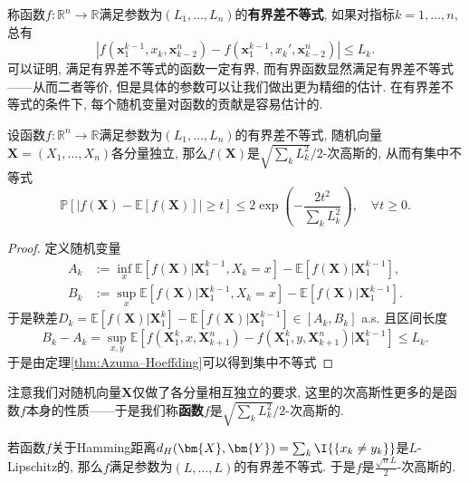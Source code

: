 称函数$f \colon \mathbb{R}^n \to \mathbb{R}$满足参数为$(L_1, \dots, L_n)$的\textbf{有界差不等式}, 如果对指标$k = 1, \dots, n$, 总有
\begin{equation*}
	|f(\bm{x}_1^{k-1}, x_k, \bm{x}_{k-2}^n) - f(\bm{x}_1^{k-1}, x_k', \bm{x}_{k-2}^n)| 
	\leq L_k. 
\end{equation*} 
可以证明, 满足有界差不等式的函数一定有界, 而有界函数显然满足有界差不等式——从而二者等价, 但是具体的参数可以让我们做出更为精细的估计.  
在有界差不等式的条件下, 每个随机变量对函数的贡献是容易估计的.
\begin{corollary}[有界差不等式]\label{cor:BddDiffIneq}
	设函数$f \colon \mathbb{R}^n \to \mathbb{R}$满足参数为$(L_1, \dots, L_n)$的有界差不等式, 随机向量$\bm{X} = (X_1, \dots, X_n)$各分量独立, 那么$f(\bm{X})$是$\sqrt{\sum_k L_k^2} / 2$-次高斯的, 从而有集中不等式
	\begin{equation}
		\mathbb{P}[|f(\bm{X}) - \mathbb{E}[f(\bm{X})]| \geq t] 
		\leq 2 \exp\left( - \frac{2 t^2}{\sum_k L_k^2} \right), 
		\quad \forall t \geq 0. 
	\end{equation}
\end{corollary}
\begin{proof}
	定义随机变量 
	\begin{align*}
		A_k &:= \inf_x \mathbb{E}[f(\bm{X})|\bm{X}_1^{k-1}, X_k = x] - \mathbb{E}[f(\bm{X})|\bm{X}_1^{k-1}], \\
		B_k &:= \sup_x \mathbb{E}[f(\bm{X})|\bm{X}_1^{k-1}, X_k = x] - \mathbb{E}[f(\bm{X})|\bm{X}_1^{k-1}]. 
	\end{align*} 
	于是鞅差$D_k = \mathbb{E}[f(\bm{X})|\bm{X}_1^{k}] - \mathbb{E}[f(\bm{X})|\bm{X}_1^{k-1}] \in [A_k, B_k]$ a.s. 且区间长度
	\begin{equation*}
		B_k - A_k
		= \sup_{x, y} \mathbb{E}[f(\bm{X}_1^k, x, \bm{X}_{k+1}^n) - f(\bm{X}_1^k, y, \bm{X}_{k+1}^n) | \bm{X}_1^{k-1}] 
		\leq L_k. 
	\end{equation*}
	于是由定理\ref{thm:Azuma–Hoeffding}可以得到集中不等式
\end{proof}

\begin{remark}[次高斯函数]
	注意我们对随机向量$\bm X$仅做了各分量相互独立的要求, 这里的次高斯性更多的是函数$f$本身的性质——于是我们称\textbf{函数}$f$是$\sqrt{\sum_k L_k^2} / 2$-次高斯的. 
\end{remark}

\begin{example}
	若函数$f$关于Hamming距离$d_H(\bm{X}, \bm{Y}) = \sum_k \I{\{x_k \neq y_k\}}$是$L$-Lipschitz的, 那么$f$满足参数为$(L, \dots, L)$的有界差不等式. 
	于是$f$是$\frac{\sqrt{n} L}{2}$-次高斯的. 
\end{example}

